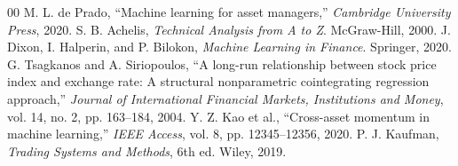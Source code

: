 \documentclass[conference]{IEEEtran}
\begin{document}
\begin{thebibliography}{00}
 M. L. de Prado, ``Machine learning for asset managers,'' \textit{Cambridge University Press}, 2020.
 S. B. Achelis, \textit{Technical Analysis from A to Z}. McGraw-Hill, 2000.
 J. Dixon, I. Halperin, and P. Bilokon, \textit{Machine Learning in Finance}. Springer, 2020.
 G. Tsagkanos and A. Siriopoulos, ``A long-run relationship between stock price index and exchange rate: A structural nonparametric cointegrating regression approach,'' \textit{Journal of International Financial Markets, Institutions and Money}, vol. 14, no. 2, pp. 163--184, 2004.
 Y. Z. Kao et al., ``Cross-asset momentum in machine learning,'' \textit{IEEE Access}, vol. 8, pp. 12345--12356, 2020.
 P. J. Kaufman, \textit{Trading Systems and Methods}, 6th ed. Wiley, 2019.
\end{thebibliography}
\vspace{12pt}
\end{document}
